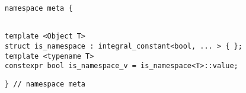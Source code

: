 
\begin{verbatim}
namespace meta {
\end{verbatim}
\begin{verbatim}

template <Object T>
struct is_namespace : integral_constant<bool, ... > { };
template <typename T>
constexpr bool is_namespace_v = is_namespace<T>::value;

\end{verbatim}
\begin{verbatim}
} // namespace meta
\end{verbatim}
